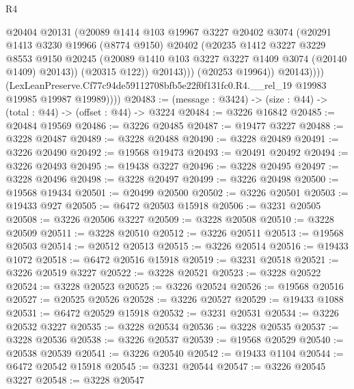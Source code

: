 \begin{lexlean}{R4}
\begin{coremodule}
                        @20404
                        @20131
                        (@20089
                          @1414
                          @103
                          @19967
                          @3227
                          @20402
                          @3074
                          (@20291
                            @1413
                            @3230
                            @19966
                            (@8774 @9150)
                            @20402
                            (@20235
                              @1412
                              @3227
                              @3229
                              @8553
                              @9150
                              @20245
                              (@20089 @1410 @103 @3227 @3227 @1409 @3074 (@20140 @1409) @20143))
                            (@20315 @122))
                          @20143)))
                    (@20253 @19964))
                  @20143))))
          (LexLeanPreserve.Cf77c94de59112708bfb5e22f0f131fc0.R4.__rel_19
            @19983
            @19985
            @19987
            @19989))))
@20483 := (message : @3424) -> (size : @44) -> (total : @44) -> (offset : @44) -> @3224
@20484 := @3226 @16842
@20485 := @20484 @19569
@20486 := @3226 @20485
@20487 := @19477 @3227
@20488 := @3228 @20487
@20489 := @3228 @20488
@20490 := @3228 @20489
@20491 := @3226 @20490
@20492 := @19568 @19473
@20493 := @20491 @20492
@20494 := @3226 @20493
@20495 := @19438 @3227
@20496 := @3228 @20495
@20497 := @3228 @20496
@20498 := @3228 @20497
@20499 := @3226 @20498
@20500 := @19568 @19434
@20501 := @20499 @20500
@20502 := @3226 @20501
@20503 := @19433 @927
@20505 := @6472 @20503 @15918
@20506 := @3231 @20505
@20508 := @3226 @20506 @3227
@20509 := @3228 @20508
@20510 := @3228 @20509
@20511 := @3228 @20510
@20512 := @3226 @20511
@20513 := @19568 @20503
@20514 := @20512 @20513
@20515 := @3226 @20514
@20516 := @19433 @1072
@20518 := @6472 @20516 @15918
@20519 := @3231 @20518
@20521 := @3226 @20519 @3227
@20522 := @3228 @20521
@20523 := @3228 @20522
@20524 := @3228 @20523
@20525 := @3226 @20524
@20526 := @19568 @20516
@20527 := @20525 @20526
@20528 := @3226 @20527
@20529 := @19433 @1088
@20531 := @6472 @20529 @15918
@20532 := @3231 @20531
@20534 := @3226 @20532 @3227
@20535 := @3228 @20534
@20536 := @3228 @20535
@20537 := @3228 @20536
@20538 := @3226 @20537
@20539 := @19568 @20529
@20540 := @20538 @20539
@20541 := @3226 @20540
@20542 := @19433 @1104
@20544 := @6472 @20542 @15918
@20545 := @3231 @20544
@20547 := @3226 @20545 @3227
@20548 := @3228 @20547

\end{coremodule}
\end{lexlean}
